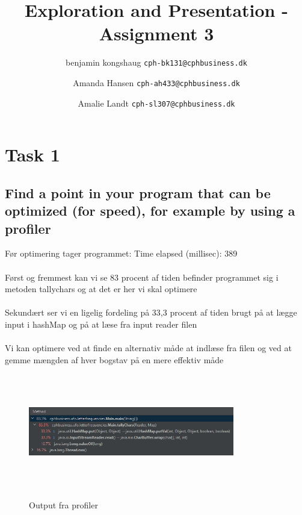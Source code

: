 \documentclass[12pt]{article}
\begin{document}
\title{Exploration and Presentation - Assignment 3}
\maketitle
\author{
  benjamin kongshaug
  \texttt{cph-bk131@cphbusiness.dk}

}
\author{
  Amanda Hansen
  \texttt{cph-ah433@cphbusiness.dk}

}
\author{
  Amalie Landt
  \texttt{cph-sl307@cphbusiness.dk}

}
\thispagestyle{empty}
\pagebreak

\setcounter{secnumdepth}{4}
\tableofcontents

\pagebreak

\section{Task 1}

\subsection{Find a point in your program that can be optimized (for speed), for example by using a profiler}

Før optimering tager programmet: Time elapsed (millisec): 389 \\ \\
Først og fremmest kan vi se 83 procent af tiden befinder programmet sig i metoden tallychars og at det er her vi skal optimere \\ \\
Sekundært ser vi en ligelig fordeling på 33,3 procent af tiden brugt på at lægge input i hashMap og på at læse fra input reader filen \\ \\
Vi kan optimere ved at finde en alternativ måde at indlæse fra filen og ved at gemme mængden af hver bogstav på en mere effektiv måde

\begin{figure}[h!]
\begin{center}
\caption{Output fra profiler}
\includegraphics[width=9cm,height=5cm]{før_optimering.PNG}
\label{fig:cclogo}
\end{center}
\label{fig:firstFigureLabel}
\end{figure}
\end{document}
